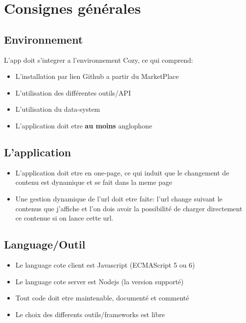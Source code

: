 \documentclass{42-fr}
\begin{document}

\chapter{Consignes g\'en\'erales}


    \section{Environnement}
        L'app doit s'integrer a l'environnement Cozy, ce qui comprend:

        \begin{itemize}\itemsep1pt
            \item L'installation par lien Github a partir du MarketPlace
            \item L'utilisation des diff\'erentes outils/API
            \item L'utilisation du data-system
            \item L'application doit etre \textbf{au moins} anglophone
        \end{itemize}

    \section{L'application}
        \begin{itemize}\itemsep1pt
            \item L'application doit etre en one-page, ce qui induit que le
				changement de contenu est dynamique et se fait dans la meme page
            \item Une gestion dynamique de l'url doit etre faite: l'url change
				suivant le contenus que j'affiche et l'on dois avoir la
        possibilit\'e de charger directement ce contenue si on lance cette url.
        \end{itemize}

    \section{Language/Outil}
        \begin{itemize}\itemsep1pt
            \item Le language cote client est Javascript (ECMAScript 5 ou 6)
            \item Le language cote server est Nodejs (la version support\'e)
            \item Tout code doit etre maintenable, document\'e et comment\'e
            \item Le choix des differents outils/frameworks est libre
        \end{itemize}
\end{document}
